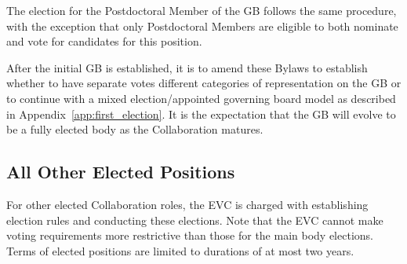 \documentclass[12pt]{article}
\begin{document}
The election for the Postdoctoral Member of the GB follows the same procedure, with the exception that only \textcolor{\markcolor}{Postdoctoral Members are eligible to both nominate and vote for candidates for this position.} 

After the initial GB is established, it is to amend these Bylaws to establish whether to have separate votes different categories of representation on the GB or to continue with a mixed election/appointed governing board model as described in Appendix~\ref{app:first_election}. It is the expectation that the GB will evolve to be a fully elected body as the Collaboration matures.




\subsection{All Other Elected Positions}
For other elected Collaboration roles, the EVC is charged with establishing election rules and conducting these elections. Note that the EVC cannot make voting requirements more restrictive than those for the main body elections. Terms of elected positions are limited to durations of at most two years. 
\end{document}
